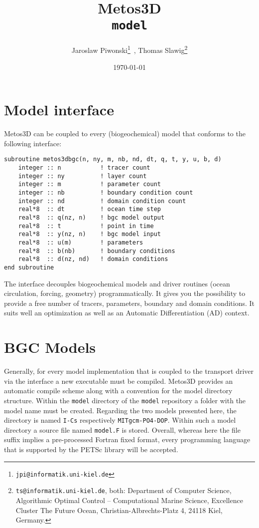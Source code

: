 \documentclass{article}
\begin{document}
%
%
\title{
Metos3D \\
\medskip
\texttt{model}
}
\author{
Jaroslaw Piwonski\thanks{\texttt{jpi@informatik.uni-kiel.de}} \,,
Thomas Slawig\thanks{\texttt{ts@informatik.uni-kiel.de},
both: Department of Computer Science, Algorithmic Optimal Control -- Computational Marine Science,
Excellence Cluster The Future Ocean, Christian-Albrechts-Platz 4, 24118 Kiel, Germany.}
}
\date{\today}
\maketitle

%
%
\section{Model interface}

Metos3D can be coupled to every (biogeochemical) model that conforms to the following interface:

\begin{verbatim}
subroutine metos3dbgc(n, ny, m, nb, nd, dt, q, t, y, u, b, d)
    integer :: n           ! tracer count
    integer :: ny          ! layer count
    integer :: m           ! parameter count
    integer :: nb          ! boundary condition count
    integer :: nd          ! domain condition count
    real*8  :: dt          ! ocean time step
    real*8  :: q(nz, n)    ! bgc model output
    real*8  :: t           ! point in time
    real*8  :: y(nz, n)    ! bgc model input
    real*8  :: u(m)        ! parameters
    real*8  :: b(nb)       ! boundary conditions
    real*8  :: d(nz, nd)   ! domain conditions
end subroutine
\end{verbatim}

The interface decouples biogeochemical models and driver routines
(ocean circulation, forcing, geometry) programmatically.
%
It gives you the possibility to provide a free number of tracers,
parameters, boundary and domain conditions. It suits well an
optimization as well as an Automatic Differentiation (AD) context.
%


%
%
\section{BGC Models}

Generally,
for every model implementation that
is coupled to the transport driver via the interface
a new executable must be compiled.
%
Metos3D provides an automatic compile scheme
along with a convention for the model directory structure.
%
Within the \texttt{model} directory of the \texttt{model} repository
a folder with the model name must be created.
%
Regarding the two models presented here,
the directory is named \texttt{I-Cs} respectively
\texttt{MITgcm-PO4-DOP}.
%
Within such a model directory a source file named
\texttt{model.F} is stored.
%
Overall,
whereas here the file suffix implies a pre-processed Fortran fixed format,
every programming language that is supported by the PETSc library
will be accepted.
\end{document}
